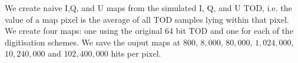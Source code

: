 \documentclass[a4paper,fleqn,usenatbib]{mnras}
\begin{document}
We create naive I,Q, and U maps from the simulated I, Q, and U TOD, i.e. the value of a map pixel is the average of all TOD samples lying within that pixel. We create four maps: one using the original 64 bit TOD and one for each of the digitisation schemes. We save the ouput maps at $800$, $8,000$, $80,000$, $1,024,000$, $10,240,000$ and $102,400,000$ hits per pixel.





\end{document}
